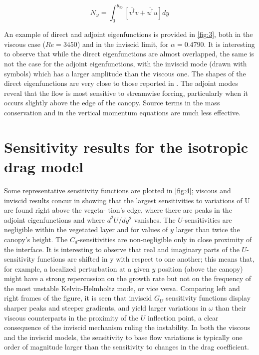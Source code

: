 \begin{equation}
N_{\omega} = \int_0^{y_{\infty}} \left[ \overline{ v^{\dagger}} v  +  \overline{ u^{\dagger}} u \right] dy
\label{eq:norm}
\end{equation}

An example of direct and adjoint eigenfunctions is provided in \ref{fig:3}, both in the viscous case
($Re = 3450$) and in the inviscid limit, for $\alpha = 0.4790$. It is interesting to observe that while the
direct eigenfunctions are almost overlapped, the same is not the case for the adjoint eigenfunctions,
with the inviscid mode (drawn with symbols) which has a larger amplitude than the viscous one.
The shapes of the direct eigenfunctions are very close to those reported in \citet{zampogna2016instability}. The adjoint modes
reveal that the flow is most sensitive to streamwise forcing, particularly when it occurs slightly
above the edge of the canopy. Source terms in the mass conservation and in the vertical momentum
equations are much less effective.


\section{Sensitivity results for the isotropic drag model}
\label{sec:3}

Some representative sensitivity functions are plotted in \ref{fig:4}; viscous and inviscid results
concur in showing that the largest sensitivities to variations of U are found right above the vegeta-
tion’s edge, where there are peaks in the adjoint eigenfunctions and where $d^2 U/d y^2$ vanishes. The
$U$-sensitivities are negligible within the vegetated layer and for values of $y$ larger than twice the
canopy’s height. The $C_d$-sensitivities are non-negligible only in close proximity of the interface.
It is interesting to observe that real and imaginary parts of the $U$-sensitivity functions are
shifted in y with respect to one another; this means that, for example, a localized perturbation at
a given $y$ position (above the canopy) might have a strong repercussion on the growth rate but not
on the frequency of the most unstable Kelvin-Helmholtz mode, or vice versa. Comparing left and
right frames of the figure, it is seen that inviscid $G_U$ sensitivity functions display sharper peaks and
steeper gradients, and yield larger variations in $\omega$ than their viscous counterparts in the proximity of
the $U$ inflection point, a clear consequence of the inviscid mechanism ruling the instability. In both
the viscous and the inviscid models, the sensitivity to base flow variations is typically one order of
magnitude larger than the sensitivity to changes in the drag coefficient.

